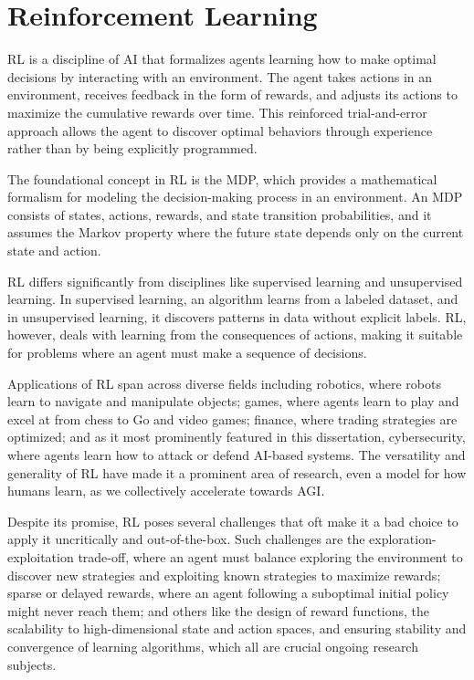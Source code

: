 \section{Reinforcement Learning}

\gls{RL} is a discipline of \gls{AI} that formalizes agents learning how to make optimal decisions by interacting with an environment.
The agent takes actions in an environment, receives feedback in the form of rewards, and adjusts its actions to maximize the cumulative rewards over time.
This reinforced trial-and-error approach allows the agent to discover optimal behaviors through experience rather than by being explicitly programmed.

The foundational concept in \gls{RL} is the \gls{MDP}, which provides a mathematical formalism for modeling the decision-making process in an environment.
An \gls{MDP} consists of states, actions, rewards, and state transition probabilities, and it assumes the Markov property where the future state depends only on the current state and action.

\gls{RL} differs significantly from disciplines like supervised learning and unsupervised learning.
In supervised learning, an algorithm learns from a labeled dataset, and in unsupervised learning, it discovers patterns in data without explicit labels.
\gls{RL}, however, deals with learning from the consequences of actions, making it suitable for problems where an agent must make a sequence of decisions.

Applications of \gls{RL} span across diverse fields including robotics, where robots learn to navigate and manipulate objects; games, where agents learn to play and excel at from chess to Go and video games; finance, where trading strategies are optimized; and as it most prominently featured in this dissertation, cybersecurity, where agents learn how to attack or defend AI-based systems.
The versatility and generality of \gls{RL} have made it a prominent area of research, even a model for how humans learn, as we collectively accelerate towards \gls{AGI}.

Despite its promise, \gls{RL} poses several challenges that oft make it a bad choice to apply it uncritically and out-of-the-box.
Such challenges are the exploration-exploitation trade-off, where an agent must balance exploring the environment to discover new strategies and exploiting known strategies to maximize rewards; sparse or delayed rewards, where an agent following a suboptimal initial policy might never reach them; and others like the design of reward functions, the scalability to high-dimensional state and action spaces, and ensuring stability and convergence of learning algorithms, which all are crucial ongoing research subjects.

